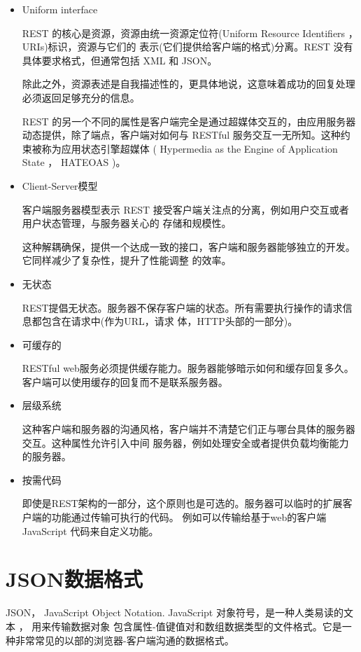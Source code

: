 \begin{itemize}

\item Uniform interface

REST 的核心是资源，资源由统一资源定位符(Uniform Resource Identifiers ， URIs)标识，资源与它们的
表示(它们提供给客户端的格式)分离。REST 没有具体要求格式，但通常包括 XML 和 JSON。

除此之外，资源表述是自我描述性的，更具体地说，这意味着成功的回复处理必须返回足够充分的信息。

REST 的另一个不同的属性是客户端完全是通过超媒体交互的，由应用服务器动态提供，除了端点，客户端对如何与 RESTful
服务交互一无所知。这种约束被称为应用状态引擎超媒体 ( Hypermedia as the Engine of Application State ， HATEOAS )\cite{RESTfulService}。

\item Client-Server模型

客户端服务器模型表示 REST 接受客户端关注点的分离，例如用户交互或者用户状态管理，与服务器关心的
存储和规模性。

这种解耦确保，提供一个达成一致的接口，客户端和服务器能够独立的开发。它同样减少了复杂性，提升了性能调整
的效率。

\item 无状态

REST提倡无状态。服务器不保存客户端的状态。所有需要执行操作的请求信息都包含在请求中(作为URL，请求
体，HTTP头部的一部分)。

\item 可缓存的

RESTful web服务必须提供缓存能力。服务器能够暗示如何和缓存回复多久。客户端可以使用缓存的回复而不是联系服务器。

\item 层级系统

这种客户端和服务器的沟通风格，客户端并不清楚它们正与哪台具体的服务器交互。这种属性允许引入中间
服务器，例如处理安全或者提供负载均衡能力的服务器。

\item 按需代码

即使是REST架构的一部分，这个原则也是可选的。服务器可以临时的扩展客户端的功能通过传输可执行的代码。
例如可以传输给基于web的客户端 JavaScript 代码来自定义功能。

\end{itemize}
\section{JSON数据格式}
JSON， JavaScript Object Notation\cite{WikiJSON}. JavaScript 对象符号，是一种人类易读的文本 ， 用来传输数据对象
包含属性-值键值对和数组数据类型的文件格式。它是一种非常常见的以部的浏览器-客户端沟通的数据格式。

